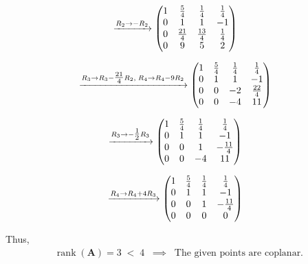 \documentclass[12pt]{article}
\begin{document}
\begin{align}
&\xrightarrow{R_2 \to -R_2}
\begin{pmatrix}
1 & \tfrac{5}{4} & \tfrac{1}{4} & \tfrac{1}{4} \\
0 & 1 & 1 & -1 \\
0 & \tfrac{21}{4} & \tfrac{13}{4} & \tfrac{1}{4} \\
0 & 9 & 5 & 2
\end{pmatrix}
\end{align}

\begin{align}
&\xrightarrow{R_3 \to R_3 - \tfrac{21}{4}R_2,\; R_4 \to R_4 - 9R_2}
\begin{pmatrix}
1 & \tfrac{5}{4} & \tfrac{1}{4} & \tfrac{1}{4} \\
0 & 1 & 1 & -1 \\
0 & 0 & -2 & \tfrac{22}{4} \\
0 & 0 & -4 & 11
\end{pmatrix}
\end{align}

\begin{align}
&\xrightarrow{R_3 \to -\tfrac{1}{2}R_3}
\begin{pmatrix}
1 & \tfrac{5}{4} & \tfrac{1}{4} & \tfrac{1}{4} \\
0 & 1 & 1 & -1 \\
0 & 0 & 1 & -\tfrac{11}{4} \\
0 & 0 & -4 & 11
\end{pmatrix}
\end{align}

\begin{align}
&\xrightarrow{R_4 \to R_4 + 4R_3}
\begin{pmatrix}
1 & \tfrac{5}{4} & \tfrac{1}{4} & \tfrac{1}{4} \\
0 & 1 & 1 & -1 \\
0 & 0 & 1 & -\tfrac{11}{4} \\
0 & 0 & 0 & 0
\end{pmatrix}
\end{align}

Thus,
\begin{align}
\operatorname{rank}(\mathbf{A}) = 3 \;<\; 4 \;\;\implies\;\;
\text{The given points are coplanar.}
\end{align}
\end{document}
